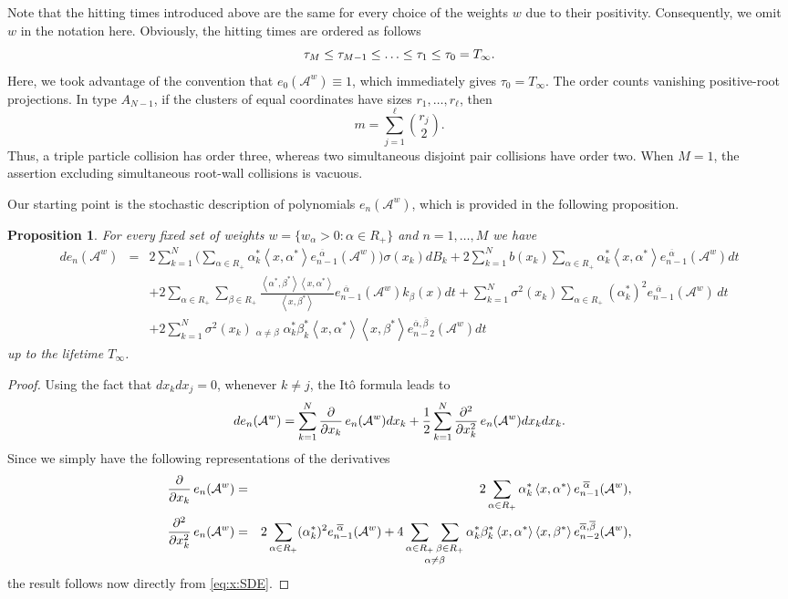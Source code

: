 \documentclass{article}
\numberwithin{equation}{section}
\newcommand{\Aa}{\mathcal{A}^{w}}
\newcommand{\xas}{\left<x,\alpha^*\right>}
\newcommand{\xbs}{\left<x,\beta^*\right>}
\newcommand{\aR}{\alpha\in R_+}
\newcommand{\bR}{\beta\in R_+}
\newcommand{\SabR}{\sum_{\alpha\in R_+}\sum_{\beta\in R_+}}
\newcommand{\SanbR}{\mathop{\sum_{\aR}\sum_{\bR}}_{\alpha\neq \beta}}
\newcommand{\abs}{\left<\alpha^*,\beta^*\right>}
\newcommand{\shift}{\,\,}
\newcommand{\eA}[1]{e_{#1}(\Aa)}
\newcommand{\eaA}[1]{e_{#1}^{\shift\overline{\alpha}}(\Aa)}
\newcommand{\eabA}[1]{e_{#1}^{\overline{\alpha}, \overline{\beta}}(\Aa)}
\newcommand{\lifetime}{T_\infty}
\theoremstyle{plain}
\newtheorem{proposition}{Proposition}
\begin{document}
Note that the hitting times introduced above are the same for every choice of the weights $w$ due to their positivity. Consequently, we omit $w$ in the notation here. Obviously, the hitting times are ordered as follows
$$
	\tau_{M}\leq \tau_{M-1}\leq \ldots\leq \tau_1\leq \tau_0=\lifetime\/.
$$
Here, we took advantage of the convention that $\eA{0}\equiv 1$, which immediately gives $\tau_0=\lifetime$. The order counts vanishing positive-root projections. In type $A_{N-1}$, if the clusters of equal coordinates have sizes $r_1,\ldots,r_\ell$, then
    \begin{equation*}
        m=\sum_{j=1}^{\ell}\binom{r_j}{2}.
    \end{equation*}
Thus, a triple particle collision has order three, whereas two simultaneous disjoint pair collisions have order two. When $M=1$, the assertion excluding simultaneous root-wall collisions is vacuous.

Our starting point is the stochastic description of polynomials $\eA{n}$, which is provided in the following proposition.



\begin{proposition}
	\label{prop:eA:SDE}
	For every fixed set of weights $w = \{w_\alpha>0: \alpha\in R_+\}$ and $n=1,\ldots,M$ we have
	\begin{eqnarray*}
	d\eA{n} &=& 2\sum_{k=1}^N\bigg(\sum_{\aR} \alpha_k^* \xas \eaA{n-1}\bigg)\sigma(x_k)dB_k+2\sum_{k=1}^N b(x_k)\sum_{\aR}\alpha_k^* \xas \eaA{n-1}dt\\
	&&+ 2\SabR \frac{\abs\xas}{\xbs} \eaA{n-1}k_\beta(x)dt+\sum_{k=1}^N\sigma^2(x_k)\sum_{\aR}(\alpha_k^*)^2\eaA{n-1}\,dt\\
	&&+ 2\sum_{k=1}^N \sigma^2(x_k)\SanbR \alpha_k^*\beta_k^* \xas \xbs \eabA{n-2} dt
\end{eqnarray*}
up to the lifetime $\lifetime$.
\end{proposition}
\begin{proof}
Using the fact that $dx_kdx_j = 0$, whenever $k\neq j$, the It\^o formula leads to 
\begin{equation*}
     d\eA{n} =   \sum_{k=1}^N \dfrac{\partial}{\partial x_k}\, \eA{n}dx_k + \dfrac12 \sum_{k=1}^N  \dfrac{\partial^2}{\partial x_k^2}\, \eA{n} dx_kdx_k\/.
\end{equation*}
Since we simply have the following representations of the derivatives
\begin{eqnarray*}
    \dfrac{\partial}{\partial x_k}\, \eA{n} & = & 2 \sum_{\aR} \alpha_k^* \xas\eaA{n-1}\/,\\
    \dfrac{\partial^2}{\partial x_k^2}\, \eA{n} & = & 2 \sum_{\aR} (\alpha_k^*)^2 \eaA{n-1} + 4 \SanbR \alpha_k^* \beta_k^* \xas \xbs \eabA{n-2} \/,
\end{eqnarray*}
the result follows now directly from \eqref{eq:x:SDE}.
\end{proof}
\end{document}

